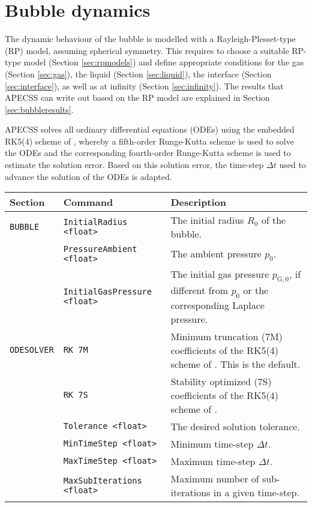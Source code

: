 \chapter{Bubble dynamics}

The dynamic behaviour of the bubble is modelled with a Rayleigh-Plesset-type (RP) model, assuming spherical symmetry. This requires to choose a suitable RP-type model (Section \ref{sec:rpmodels}) and define appropriate conditions for the gas  (Section \ref{sec:gas}), the liquid (Section \ref{sec:liquid}), the interface (Section \ref{sec:interface}), as well as at infinity (Section \ref{sec:infinity}). The results that APECSS can write out based on the RP model are explained in Section \ref{sec:bubbleresults}.

APECSS solves all ordinary differential equations (ODEs) using the embedded RK5(4) scheme of \citet{Dormand1980}, whereby a fifth-order Runge-Kutta scheme is used to solve the ODEs and the corresponding fourth-order Runge-Kutta scheme is used to estimate the solution error. Based on this solution error, the time-step $\Delta t$ used to advance the solution of the ODEs is adapted. 

\vspace{0.8em}

\noindent
\begin{tabular}{p{} p{} p{}}
    \textbf{Section} &\textbf{Command} & \textbf{Description} 
\vspace{1mm} \\ \hline
{\tt BUBBLE} & {\tt InitialRadius <float>} & The initial radius $R_0$ of the bubble.\\ 
 & {\tt PressureAmbient <float>} & The ambient pressure $p_0$.\\ 
 & {\tt InitialGasPressure <float>} & The initial gas pressure $p_{\mathrm{G},0}$, if different from $p_0$ or the corresponding Laplace pressure.\\ 
{\tt ODESOLVER} & {\tt RK 7M} & Minimum truncation (7M) coefficients of the RK5(4) scheme of \citet{Dormand1980}. This is the default.\\ 
& {\tt RK 7S} & Stability optimized (7S) coefficients of the RK5(4) scheme of \citet{Dormand1980}.\\ 
& {\tt Tolerance <float>} & The desired solution tolerance.\\ 
& {\tt MinTimeStep <float>} & Minimum time-step $\Delta t$.\\ 
& {\tt MaxTimeStep <float>} & Maximum time-step $\Delta t$.\\ 
& {\tt MaxSubIterations <float>} & Maximum number of sub-iterations in a given time-step.\\ 
 \hline
\end{tabular} \vspace{1em}

